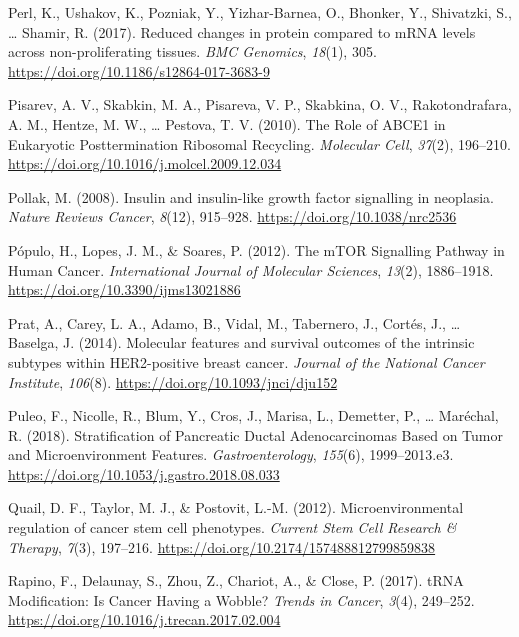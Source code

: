 \documentclass[12pt,openany]{book}
\begin{document}
\hypertarget{ref-Perl2017}{}
Perl, K., Ushakov, K., Pozniak, Y., Yizhar-Barnea, O., Bhonker, Y.,
Shivatzki, S., \ldots{} Shamir, R. (2017). Reduced changes in protein
compared to mRNA levels across non-proliferating tissues. \emph{BMC
Genomics}, \emph{18}(1), 305.
\url{https://doi.org/10.1186/s12864-017-3683-9}

\hypertarget{ref-Pisarev2010}{}
Pisarev, A. V., Skabkin, M. A., Pisareva, V. P., Skabkina, O. V.,
Rakotondrafara, A. M., Hentze, M. W., \ldots{} Pestova, T. V. (2010).
The Role of ABCE1 in Eukaryotic Posttermination Ribosomal Recycling.
\emph{Molecular Cell}, \emph{37}(2), 196--210.
\url{https://doi.org/10.1016/j.molcel.2009.12.034}

\hypertarget{ref-Pollak2008}{}
Pollak, M. (2008). Insulin and insulin-like growth factor signalling in
neoplasia. \emph{Nature Reviews Cancer}, \emph{8}(12), 915--928.
\url{https://doi.org/10.1038/nrc2536}

\hypertarget{ref-Populo2012}{}
Pópulo, H., Lopes, J. M., \& Soares, P. (2012). The mTOR Signalling
Pathway in Human Cancer. \emph{International Journal of Molecular
Sciences}, \emph{13}(2), 1886--1918.
\url{https://doi.org/10.3390/ijms13021886}

\hypertarget{ref-Prat2014}{}
Prat, A., Carey, L. A., Adamo, B., Vidal, M., Tabernero, J., Cortés, J.,
\ldots{} Baselga, J. (2014). Molecular features and survival outcomes of
the intrinsic subtypes within HER2-positive breast cancer. \emph{Journal
of the National Cancer Institute}, \emph{106}(8).
\url{https://doi.org/10.1093/jnci/dju152}

\hypertarget{ref-Puleo2018}{}
Puleo, F., Nicolle, R., Blum, Y., Cros, J., Marisa, L., Demetter, P.,
\ldots{} Maréchal, R. (2018). Stratification of Pancreatic Ductal
Adenocarcinomas Based on Tumor and Microenvironment Features.
\emph{Gastroenterology}, \emph{155}(6), 1999--2013.e3.
\url{https://doi.org/10.1053/j.gastro.2018.08.033}

\hypertarget{ref-Quail2012}{}
Quail, D. F., Taylor, M. J., \& Postovit, L.-M. (2012).
Microenvironmental regulation of cancer stem cell phenotypes.
\emph{Current Stem Cell Research \& Therapy}, \emph{7}(3), 197--216.
\url{https://doi.org/10.2174/157488812799859838}

\hypertarget{ref-Rapino2017}{}
Rapino, F., Delaunay, S., Zhou, Z., Chariot, A., \& Close, P. (2017).
tRNA Modification: Is Cancer Having a Wobble? \emph{Trends in Cancer},
\emph{3}(4), 249--252.
\url{https://doi.org/10.1016/j.trecan.2017.02.004}
\end{document}
